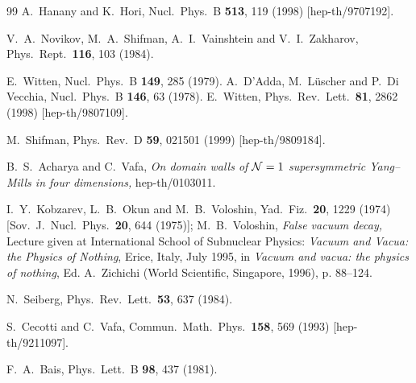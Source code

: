 \begin{thebibliography} {99}
A.~Hanany and K.~Hori,
Nucl.\ Phys.\ B {\bf 513}, 119 (1998)
[hep-th/9707192].

V.~A.~Novikov, M.~A.~Shifman, A.~I.~Vainshtein and V.~I.~Zakharov,
Phys.\ Rept.\  {\bf 116}, 103 (1984).

E.~Witten,
Nucl.\ Phys.\ B {\bf 149}, 285 (1979).
A.~D'Adda, M.~L\"{u}scher and P.~Di Vecchia,
Nucl.\ Phys.\ B {\bf 146}, 63 (1978).
E.~Witten,
Phys.\ Rev.\ Lett.\  {\bf 81}, 2862 (1998)
[hep-th/9807109].

M.~Shifman,
Phys.\ Rev.\ D {\bf 59}, 021501 (1999)
[hep-th/9809184].

B.~S.~Acharya and C.~Vafa,
{\em On domain walls of ${\cal N} = 1$ supersymmetric Yang--Mills 
in four dimensions,} hep-th/0103011.

I.~Y.~Kobzarev, L.~B.~Okun and M.~B.~Voloshin,
Yad.\ Fiz.\  {\bf 20}, 1229 (1974)
[Sov.\ J.\ Nucl.\ Phys.\  {\bf 20}, 644 (1975)];
M.~B.~Voloshin,
{\em False vacuum decay,}
 Lecture given at International School of Subnuclear Physics: 
{\sl Vacuum and Vacua: the Physics of Nothing}, Erice, Italy, 
July 1995, 
in {\sl Vacuum and vacua: the physics of nothing}, Ed. A.~Zichichi 
(World Scientific, Singapore, 1996), p. 88--124. 

N.~Seiberg,
Phys.\ Rev.\ Lett.\  {\bf 53}, 637 (1984).

S.~Cecotti and C.~Vafa,
Commun.\ Math.\ Phys.\  {\bf 158}, 569 (1993)
[hep-th/9211097].

F.~A.~Bais,
Phys.\ Lett.\ B {\bf 98}, 437 (1981).


\end{thebibliography}
